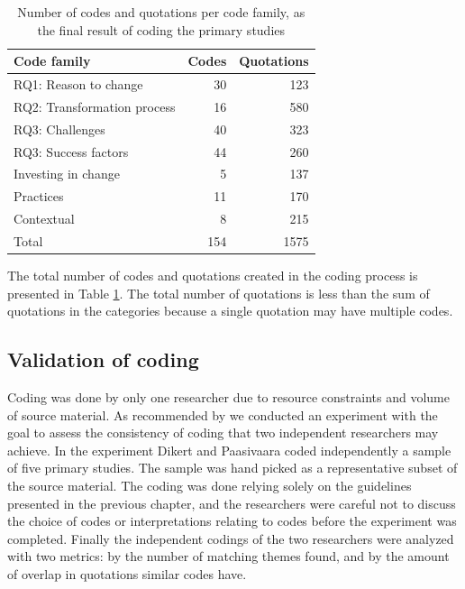 \begin{table}
    \centering
    \begin{tabular}{ l r r }
        \toprule
        Code family    &  Codes  &  Quotations
        \\
        \midrule
        RQ1: Reason to change &        30 &  123 \\
        RQ2: Transformation process &  16 &  580 \\
        RQ3: Challenges &              40 &  323 \\
        RQ3: Success factors &         44 &  260 \\
        Investing in change  &          5 &  137 \\
        Practices &                    11 &  170 \\
        Contextual &                    8 &  215 \\
        Total &                       154 & 1575 \\
        \bottomrule
    \end{tabular}
    \caption{Number of codes and quotations per code family, as the final result
    of coding the primary studies}
    \label{table:codecount}
\end{table}

\clearpage

The total number of codes and quotations created in the coding process is
presented in Table \ref{table:codecount}. The total number of quotations is less
than the sum of quotations in the categories because a single quotation may have
multiple codes.

\subsection{Validation of coding}

Coding was done by only one researcher due to resource constraints and volume of
source material. As recommended by \citet{Kitchenham2007} we conducted
an experiment with the goal to assess the consistency of coding that two
independent researchers may achieve.
In the experiment Dikert and Paasivaara coded independently a sample of five
primary studies. The sample was hand picked as a representative subset of the
source material. The coding was done relying solely on the guidelines presented
in the previous chapter, and the researchers were careful not to discuss the
choice of codes or interpretations relating to codes before the experiment was
completed. Finally the independent codings of the two researchers were analyzed
with two metrics: by the number of matching themes found, and by the amount of
overlap in quotations similar codes have.


